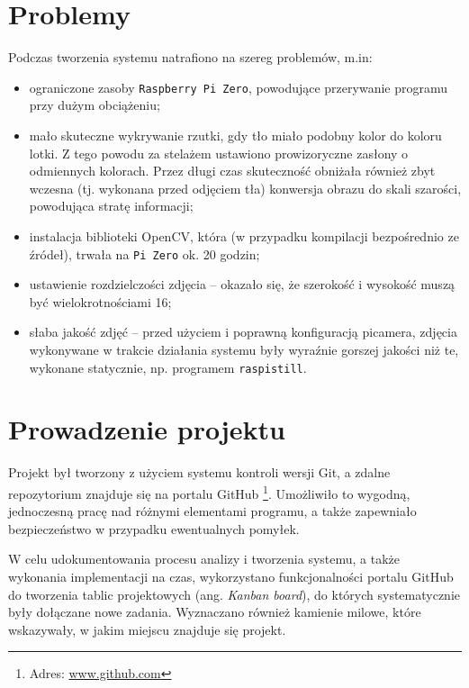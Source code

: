 \section{Problemy}
Podczas tworzenia systemu natrafiono na szereg problemów, m.in:
\begin{itemize}
  \item ograniczone zasoby \verb|Raspberry Pi Zero|, powodujące przerywanie programu przy dużym obciążeniu;
  \item mało skuteczne wykrywanie rzutki, gdy tło miało podobny kolor do koloru lotki. Z tego powodu za stelażem ustawiono prowizoryczne zasłony o odmiennych kolorach. Przez długi czas skuteczność obniżała również zbyt wczesna (tj. wykonana przed odjęciem tła) konwersja obrazu do skali szarości, powodująca stratę informacji;
  \item instalacja biblioteki OpenCV, która (w przypadku kompilacji bezpośrednio ze źródeł), trwała na \verb|Pi Zero| ok. 20 godzin;
  \item ustawienie rozdzielczości zdjęcia -- okazało się, że szerokość i wysokość muszą być wielokrotnościami 16;
  \item słaba jakość zdjęć -- przed użyciem i poprawną konfiguracją picamera, zdjęcia wykonywane w trakcie działania systemu były wyraźnie gorszej jakości niż te, wykonane statycznie, np. programem \verb|raspistill|.
\end{itemize}
\section{Prowadzenie projektu}
Projekt był tworzony z użyciem systemu kontroli wersji Git, a zdalne repozytorium znajduje się na portalu GitHub \footnote{Adres: \url{www.github.com}}. Umożliwiło to wygodną, jednoczesną pracę nad różnymi elementami programu, a także zapewniało bezpieczeństwo w przypadku ewentualnych pomyłek.

W celu udokumentowania procesu analizy i tworzenia systemu, a także wykonania implementacji na czas, wykorzystano funkcjonalności portalu GitHub do tworzenia tablic projektowych (ang. \textit{Kanban board}), do których systematycznie były dołączane nowe zadania. Wyznaczano również kamienie milowe, które wskazywały, w jakim miejscu znajduje się projekt. 